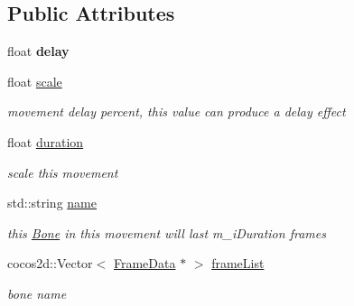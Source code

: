 \subsection*{Public Attributes}
\begin{DoxyCompactItemize}
\item 
\mbox{\label{classcocostudio_1_1MovementBoneData_a28cfec74379e7228fd0a7737a4da7020}} 
float {\bfseries delay}
\item 
\mbox{\label{classcocostudio_1_1MovementBoneData_a5144a8ef6163e45bd8024658569aa9db}} 
float \hyperlink{classcocostudio_1_1MovementBoneData_a5144a8ef6163e45bd8024658569aa9db}{scale}
\begin{DoxyCompactList}\small\item\em movement delay percent, this value can produce a delay effect \end{DoxyCompactList}\item 
\mbox{\label{classcocostudio_1_1MovementBoneData_a6f31b76d2164727139c18925b144ee8d}} 
float \hyperlink{classcocostudio_1_1MovementBoneData_a6f31b76d2164727139c18925b144ee8d}{duration}
\begin{DoxyCompactList}\small\item\em scale this movement \end{DoxyCompactList}\item 
\mbox{\label{classcocostudio_1_1MovementBoneData_a24524dd471ddce5176c3fc1b96b087b4}} 
std\+::string \hyperlink{classcocostudio_1_1MovementBoneData_a24524dd471ddce5176c3fc1b96b087b4}{name}
\begin{DoxyCompactList}\small\item\em this \hyperlink{classcocostudio_1_1Bone}{Bone} in this movement will last m\+\_\+i\+Duration frames \end{DoxyCompactList}\item 
\mbox{\label{classcocostudio_1_1MovementBoneData_a4c83389e668dea20ce910062b9cd6f29}} 
cocos2d\+::\+Vector$<$ \hyperlink{classcocostudio_1_1FrameData}{Frame\+Data} $\ast$ $>$ \hyperlink{classcocostudio_1_1MovementBoneData_a4c83389e668dea20ce910062b9cd6f29}{frame\+List}
\begin{DoxyCompactList}\small\item\em bone name \end{DoxyCompactList}\end{DoxyCompactItemize}


